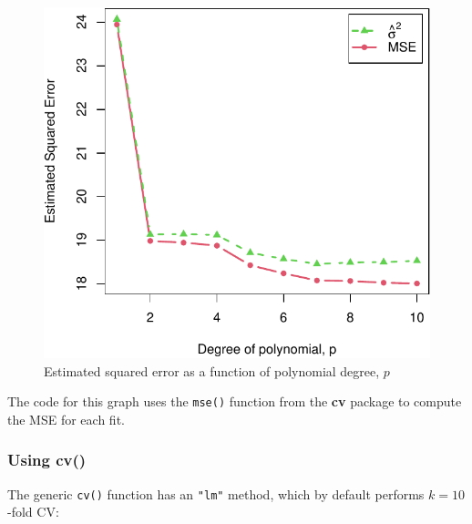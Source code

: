 \documentclass[
]{jss}
\begin{document}
\begin{CodeChunk}
\begin{figure}
{\centering \includegraphics[width=1\linewidth]{JSS-article_files/figure-latex/mpg-horsepower-MSE-se-1} 

}

\caption[Estimated squared error as a function of polynomial degree, $p$]{Estimated squared error as a function of polynomial degree, $p$}\label{fig:mpg-horsepower-MSE-se}
\end{figure}
\end{CodeChunk}

The code for this graph uses the \texttt{mse()} function from the
\textbf{cv} package to compute the MSE for each fit.

\hypertarget{using-cv}{%
\subsubsection{Using cv()}\label{using-cv}}

The generic \texttt{cv()} function has an \texttt{"lm"} method, which by
default performs \(k = 10\)-fold CV:
\end{document}
